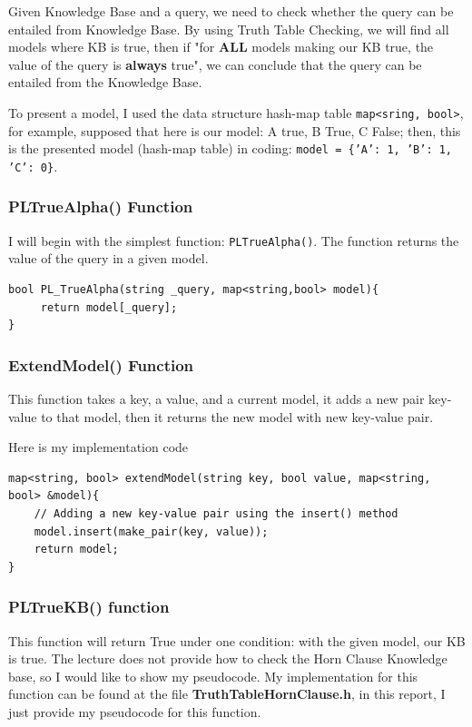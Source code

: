 \documentclass{assignment}
\begin{document}
Given Knowledge Base and a query, we need to check whether the query can be entailed from Knowledge Base. By using Truth Table Checking, we will find all  models where KB is true, then if "for \textbf{ALL} models making our KB true, the value of the query is \textbf{always} true", we can conclude that the query can be entailed from the Knowledge Base.

To present a model, I used the data structure hash-map table \texttt{map<sring, bool>}, for example, supposed that here is our model: A true, B True, C False; then, this is the presented model (hash-map table) in coding: \texttt{model = \{'A': 1, 'B': 1, 'C': 0\}}.


\subsubsection{PLTrueAlpha() Function}

I will begin with the simplest function: \texttt{PLTrueAlpha()}. The function returns the value of the query in a given model.

\lstset{language=C++}
\begin{lstlisting}[caption={PLTrueAlpha() function}]
bool PL_TrueAlpha(string _query, map<string,bool> model){
     return model[_query];
}
\end{lstlisting}

\subsubsection{ExtendModel() Function}

This function takes a key, a value, and a current model, it adds a new pair key-value to that model, then it returns the new model with new key-value pair.

Here is my implementation code

\lstset{language=C++}
\begin{lstlisting}[caption={ExtendModel() function}]
map<string, bool> extendModel(string key, bool value, map<string, bool> &model){
    // Adding a new key-value pair using the insert() method
    model.insert(make_pair(key, value));
    return model;
}
\end{lstlisting}

\subsubsection{PLTrueKB() function}

This function will return True under one condition: with the given model, our KB is true. The lecture does not provide how to check the Horn Clause Knowledge base, so I would like to show my pseudocode. My implementation for this function can be found at the file \textbf{TruthTableHornClause.h}, in this report, I just provide my pseudocode for this function. 
\end{document}
